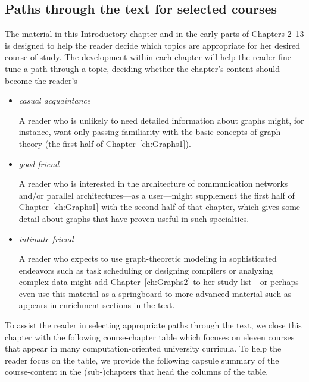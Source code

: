 \subsection{Paths through the text for selected courses}

The material in this Introductory chapter and in the early parts of Chapters 2--13 is designed to help the reader decide which topics are appropriate for her desired course of study.  The development within each chapter will help the reader fine tune a path through a topic, deciding whether the chapter's content should become the reader's
\begin{itemize}
\item
{\em casual acquaintance}

\smallskip

A reader who is unlikely to need detailed information about graphs might, for instance, want only passing familiarity with the basic concepts of graph theory (the first half of Chapter~\ref{ch:Graphs1}).

\item
{\em good friend}

\smallskip

A reader who is interested in the architecture of communication networks and/or parallel architectures---as a user---might supplement the first half of Chapter~\ref{ch:Graphs1} with the second half of that chapter, which gives some detail about graphs that have proven useful in such specialties.

\item
{\em intimate friend}

\smallskip

A reader who expects to use graph-theoretic modeling in sophisticated endeavors such as task scheduling or designing compilers or analyzing complex data might add Chapter~\ref{ch:Graphs2} to her study list---or perhaps even use this material as a springboard to more advanced material such as appears in enrichment sections in the text.
\end{itemize}

\bigskip

To assist the reader in selecting appropriate paths through the text, we close this chapter with the following course-chapter table which focuses on eleven courses that appear in many computation-oriented university curricula.  To help the reader focus on the table, we provide the following capsule summary of the course-content in the (sub-)chapters that head the columns of the table.

